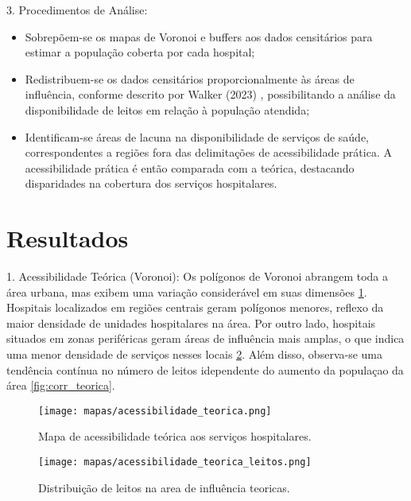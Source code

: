 \documentclass[
  8pt,
]{article}
\begin{document}
\begin{multicols}{2}
3. Procedimentos de Análise:

\begin{itemize}
    \item Sobrepõem-se os mapas de Voronoi e buffers aos dados censitários para estimar a população coberta por cada hospital;
    \item Redistribuem-se os dados censitários proporcionalmente às áreas de influência, conforme descrito por Walker (2023) , possibilitando a análise da disponibilidade de leitos em relação à população atendida;
    \item Identificam-se áreas de lacuna na disponibilidade de serviços de saúde, correspondentes a regiões fora das delimitações de acessibilidade prática. A acessibilidade prática é então comparada com a teórica, destacando disparidades na cobertura dos serviços hospitalares.
\end{itemize}

\section{Resultados}

1. Acessibilidade Teórica (Voronoi): Os polígonos de Voronoi abrangem toda a área urbana, mas exibem uma variação considerável em suas dimensões \cref{fig:acessibilidade_teorica}. Hospitais localizados em regiões centrais geram polígonos menores, reflexo da maior densidade de unidades hospitalares na área. Por outro lado, hospitais situados em zonas periféricas geram áreas de influência mais amplas, o que indica uma menor densidade de serviços nesses locais \cref{fig:acessibilidade_teorica_leitos}. Além disso, observa-se uma tendência contínua no número de leitos idependente do aumento da populaçao da área \cref{fig:corr_teorica}.

\begin{figure}[H]
    \centering
    \texttt{[image: mapas/acessibilidade\_teorica.png]}
    \caption{Mapa de acessibilidade teórica aos serviços hospitalares.}
    \label{fig:acessibilidade_teorica}
\end{figure}

\begin{figure}[H]
    \centering
    \texttt{[image: mapas/acessibilidade\_teorica\_leitos.png]}
    \caption{Distribuição de leitos na area de influência teoricas.}
    \label{fig:acessibilidade_teorica_leitos}
\end{figure}


\end{multicols}
\end{document}
